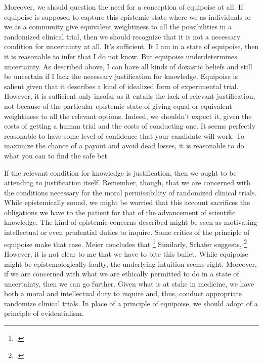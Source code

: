 \documentclass[letterpaper,notitlepage,12pt]{article}
\begin{document}
Moreover, we should question the need for a conception of equipoise at all.
If equipoise is supposed to capture this epistemic state where we as individuals
or we as a community give equivalent weightiness to all the possibilities in a
randomized clinical trial, then we should recognize that it is not a necessary
condition for uncertainty at all.
It's sufficient.
It I am in a state of equipoise, then it is reasonable to infer that I do not
know.
But equipoise underdetermines uncertainty.
As described above, I can have all kinds of doxastic beliefs and still be
uncertain if I lack the necessary justification for knowledge.
Equipoise is salient given that it describes a kind of idealized form of
experimental trial.
However, it is sufficient only insofar as it entails the lack of relevant
justification, not because of the particular epistemic state of giving equal or
equivalent weightiness to all the relevant options.
Indeed, we shouldn't expect it, given the costs of getting a human trial and the
costs of conducting one.
It seems perfectly reasonable to have some level of confidence that your
candidate will work.
To maximize the chance of a payout and avoid dead losses, it is reasonable to do
what you can to find the safe bet.

If the relevant condition for knowledge is justification, then we ought to be
attending to justification itself.
Remember, though, that we are concerned with the conditions necessary for the
moral permissibility of randomized clinical trials.
While epistemically sound, we might be worried that this account sacrifices the
obligations we have to the patient for that of the advancement of scientific
knowledge.
The kind of epistemic concerns described might be seen as motivating
intellectual or even prudential duties to inquire.
Some critics of the principle of equipoise make that case.
Meier concludes that \footcite[p. 640]{meier_terminating_1979}
Similarly, Schafer suggests, \footcite[p. 6]{schafer_commentary_1985}
However, it is not clear to me that we have to bite this bullet.
While equipoise might be epistemologically faulty, the underlying intuition
seems right.
Moreover, if we are concerned with what we are ethically permitted to do in a
state of uncertainty, then we can go further.
Given what is at stake in medicine, we have both a moral and intellectual duty
to inquire and, thus, conduct appropriate randomize clinical trials.
In place of a principle of equipoise, we should adopt of a principle of
evidentialism.
\end{document}
